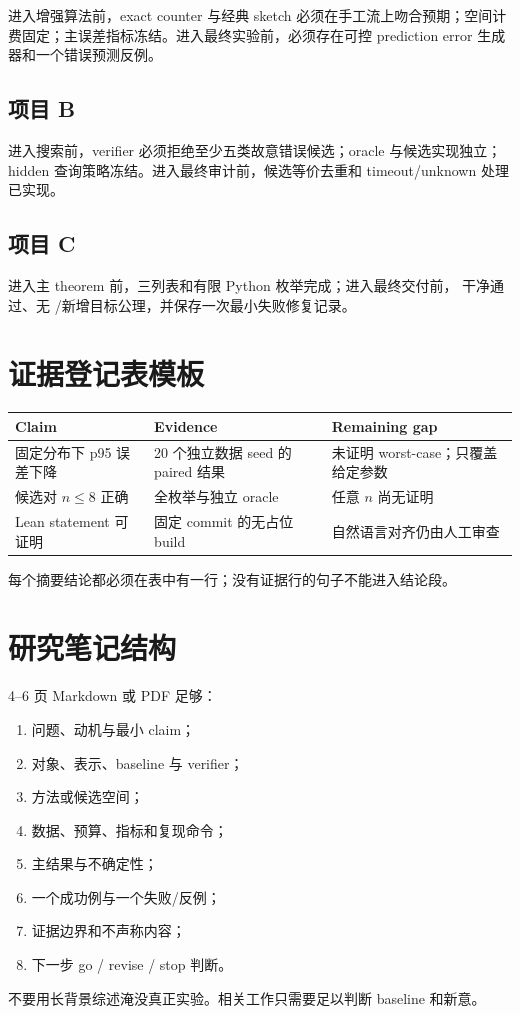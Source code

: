 进入增强算法前，exact counter 与经典 sketch 必须在手工流上吻合预期；空间计费固定；主误差指标冻结。进入最终实验前，必须存在可控 prediction error 生成器和一个错误预测反例。

\subsection{项目 B}

进入搜索前，verifier 必须拒绝至少五类故意错误候选；oracle 与候选实现独立；hidden 查询策略冻结。进入最终审计前，候选等价去重和 timeout/unknown 处理已实现。

\subsection{项目 C}

进入主 theorem 前，三列表和有限 Python 枚举完成；进入最终交付前， 干净通过、无 /新增目标公理，并保存一次最小失败修复记录。

\section{证据登记表模板}

\begin{center}
\begin{tabularx}{0.96\textwidth}{YYY}
\toprule
Claim & Evidence & Remaining gap \\
\midrule
固定分布下 p95 误差下降 & 20 个独立数据 seed 的 paired 结果 & 未证明 worst-case；只覆盖给定参数 \\
候选对 $n\le8$ 正确 & 全枚举与独立 oracle & 任意 $n$ 尚无证明 \\
Lean statement 可证明 & 固定 commit 的无占位 build & 自然语言对齐仍由人工审查 \\
\bottomrule
\end{tabularx}
\end{center}
每个摘要结论都必须在表中有一行；没有证据行的句子不能进入结论段。

\section{研究笔记结构}

4--6 页 Markdown 或 PDF 足够：
\begin{enumerate}
  \item 问题、动机与最小 claim；
  \item 对象、表示、baseline 与 verifier；
  \item 方法或候选空间；
  \item 数据、预算、指标和复现命令；
  \item 主结果与不确定性；
  \item 一个成功例与一个失败/反例；
  \item 证据边界和不声称内容；
  \item 下一步 go / revise / stop 判断。
\end{enumerate}
不要用长背景综述淹没真正实验。相关工作只需要足以判断 baseline 和新意。

